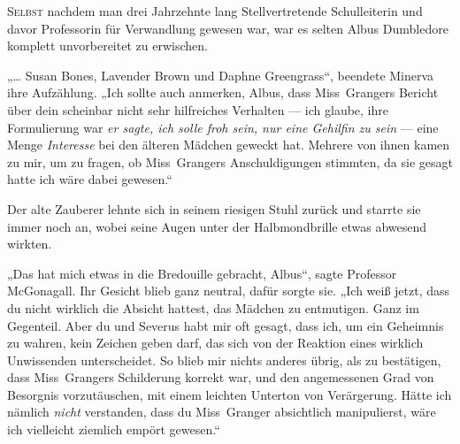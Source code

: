 
\lettrine{S}{elbst} nachdem man drei Jahrzehnte lang Stellvertretende Schulleiterin und davor Professorin für Verwandlung gewesen war, war es selten Albus Dumbledore komplett unvorbereitet zu erwischen.

„… Susan Bones, Lavender Brown und Daphne Greengrass“, beendete Minerva ihre Aufzählung.
„Ich sollte auch anmerken, Albus, dass Miss~Grangers Bericht über dein scheinbar nicht sehr hilfreiches Verhalten — ich glaube, ihre Formulierung war \emph{er sagte, ich solle froh sein, nur eine Gehilfin zu sein} — eine Menge \emph{Interesse} bei den älteren Mädchen geweckt hat. Mehrere von ihnen kamen zu mir, um zu fragen, ob Miss~Grangers Anschuldigungen stimmten, da sie gesagt hatte ich wäre dabei gewesen.“

Der alte Zauberer lehnte sich in seinem riesigen Stuhl zurück und starrte sie immer noch an, wobei seine Augen unter der Halbmondbrille etwas abwesend wirkten.

„Das hat mich etwas in die Bredouille gebracht, Albus“, sagte Professor McGonagall. Ihr Gesicht blieb ganz neutral, dafür sorgte sie.
„Ich weiß jetzt, dass du nicht wirklich die Absicht hattest, das Mädchen zu entmutigen. Ganz im Gegenteil. Aber du und Severus habt mir oft gesagt, dass ich, um ein Geheimnis zu wahren, kein Zeichen geben darf, das sich von der Reaktion eines wirklich Unwissenden unterscheidet. So blieb mir nichts anderes übrig, als zu bestätigen, dass Miss~Grangers Schilderung korrekt war, und den angemessenen Grad von Besorgnis vorzutäuschen, mit einem leichten Unterton von Verärgerung. Hätte ich nämlich \emph{nicht} verstanden, dass du Miss~Granger absichtlich manipulierst, wäre ich vielleicht ziemlich empört gewesen.“

